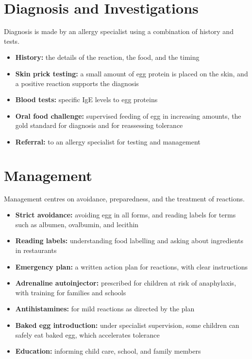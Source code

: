 \section*{Diagnosis and Investigations}
Diagnosis is made by an allergy specialist using a combination of history and tests.
\begin{itemize}
    \item \textbf{History:} the details of the reaction, the food, and the timing
    \item \textbf{Skin prick testing:} a small amount of egg protein is placed on the skin, and a positive reaction supports the diagnosis
    \item \textbf{Blood tests:} specific IgE levels to egg proteins
    \item \textbf{Oral food challenge:} supervised feeding of egg in increasing amounts, the gold standard for diagnosis and for reassessing tolerance
    \item \textbf{Referral:} to an allergy specialist for testing and management
\end{itemize}

\section*{Management}
Management centres on avoidance, preparedness, and the treatment of reactions.
\begin{itemize}
    \item \textbf{Strict avoidance:} avoiding egg in all forms, and reading labels for terms such as albumen, ovalbumin, and lecithin
    \item \textbf{Reading labels:} understanding food labelling and asking about ingredients in restaurants
    \item \textbf{Emergency plan:} a written action plan for reactions, with clear instructions
    \item \textbf{Adrenaline autoinjector:} prescribed for children at risk of anaphylaxis, with training for families and schools
    \item \textbf{Antihistamines:} for mild reactions as directed by the plan
    \item \textbf{Baked egg introduction:} under specialist supervision, some children can safely eat baked egg, which accelerates tolerance
    \item \textbf{Education:} informing child care, school, and family members
\end{itemize}

